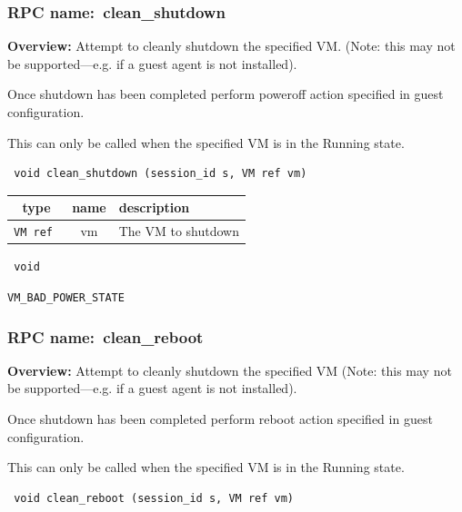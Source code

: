 \subsubsection{RPC name:~clean\_shutdown}

{\bf Overview:} 
Attempt to cleanly shutdown the specified VM. (Note: this may not be
supported---e.g. if a guest agent is not installed).

Once shutdown has been completed perform poweroff action specified in guest
configuration.

This can only be called when the specified VM is in the Running state.

\begin{verbatim} void clean_shutdown (session_id s, VM ref vm)\end{verbatim}



 
\vspace{0.3cm}
\begin{tabular}{|c|c|p{7cm}|}
 \hline
{\bf type} & {\bf name} & {\bf description} \\ \hline
{\tt VM ref } & vm & The VM to shutdown \\ \hline 

\end{tabular}

\vspace{0.3cm}

{\tt 
void
}



\vspace{0.3cm}

 {\tt VM\_BAD\_POWER\_STATE}

\vspace{0.6cm}
\subsubsection{RPC name:~clean\_reboot}

{\bf Overview:} 
Attempt to cleanly shutdown the specified VM (Note: this may not be
supported---e.g. if a guest agent is not installed).

Once shutdown has been completed perform reboot action specified in guest
configuration.

This can only be called when the specified VM is in the Running state.

\begin{verbatim} void clean_reboot (session_id s, VM ref vm)\end{verbatim}



